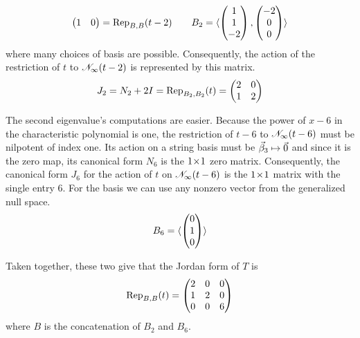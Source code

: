 \begin{example}
\begin{equation*}
\begin{pmatrix}
    1  &0  
  \end{pmatrix}
  =\rep{t-2}{B,B}
  \qquad
   B_2=\sequence{\colvec{1 \\ 1 \\ -2},
                 \colvec{-2 \\ 0 \\ 0}}  
\end{equation*}
where many choices of basis are possible.
Consequently, the action of the restriction of $t$ to 
$\gennullspace{t-2}$ is represented by this matrix.
\begin{equation*}
  J_2=N_2+2I=\rep{t}{B_2,B_2}=
  \begin{pmatrix}
    2  &0  \\
    1  &2
  \end{pmatrix}
\end{equation*}

The second eigenvalue's computations are easier.
Because the power of $x-6$ in the characteristic polynomial is one,
the restriction of $t-6$ to $\gennullspace{t-6}$
must be nilpotent of index one.
Its action on a string basis must be $\vec{\beta}_3\mapsto\zero$ and
since it is the zero map, its canonical form $N_6$ 
is the $\nbyn{1}$ zero matrix.
Consequently, the canonical form $J_6$ for the action of $t$ on 
$\gennullspace{t-6}$ is the $\nbyn{1}$ matrix with the single entry $6$.
For the basis we can use any nonzero vector from the generalized null space.  
\begin{equation*}
   B_6=\sequence{\colvec{0 \\ 1 \\ 0}}
\end{equation*}

Taken together, these two give that
the Jordan form of \( T \) is
\begin{equation*}
   \rep{t}{B,B}=
   \begin{pmatrix}
      2  &0  &0  \\
      1  &2  &0  \\
      0  &0  &6
   \end{pmatrix}
\end{equation*}
where \( B \) is the concatenation of $B_2$ and $B_6$.
\end{example}

